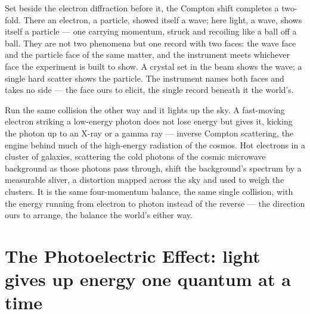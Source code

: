 Set beside the electron diffraction before it, the Compton shift completes a two-fold. There an electron,
a particle, showed itself a wave; here light, a wave, shows itself a particle --- one carrying momentum, struck
and recoiling like a ball off a ball. They are not two phenomena but one record with two faces: the wave face
and the particle face of the same matter, and the instrument meets whichever face the experiment is built to
show. A crystal set in the beam shows the wave; a single hard scatter shows the particle. The instrument names
both faces and takes no side --- the face ours to elicit, the single record beneath it the world's.

Run the same collision the other way and it lights up the sky. A fast-moving electron striking a low-energy
photon does not lose energy but gives it, kicking the photon up to an X-ray or a gamma ray --- inverse Compton
scattering, the engine behind much of the high-energy radiation of the cosmos. Hot electrons in a cluster of
galaxies, scattering the cold photons of the cosmic microwave background as those photons pass through, shift
the background's spectrum by a measurable sliver, a distortion mapped across the sky and used to weigh the
clusters. It is the same four-momentum balance, the same single collision, with the energy running from
electron to photon instead of the reverse --- the direction ours to arrange, the balance the world's either way.

\section{The Photoelectric Effect: light gives up energy one quantum at a time}
\label{se:photoelectric}

